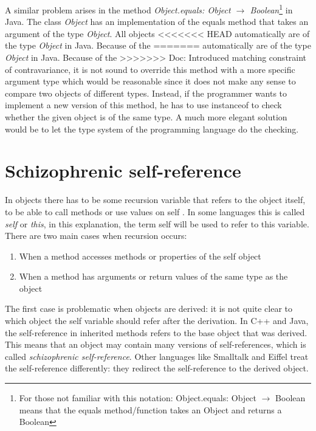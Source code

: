 A similar problem arises in the method \emph{Object.equals: Object
$\rightarrow$ Boolean}\footnote{For those not familiar with this
notation: Object.equals: Object $\rightarrow$ Boolean means that
the equals method/function takes an Object and returns a Boolean}
in Java. The class \emph{Object} has an implementation of the equals
method that takes an argument of the type \emph{Object}. All objects
<<<<<<< HEAD
automatically are of the type \emph{Object} in Java.	Because of the
=======
automatically are of the type \emph{Object} in Java.  Because of the
>>>>>>> Doc: Introduced matching
constraint of contravariance, it is not sound to override this method
with a more specific argument type which would be reasonable since it does
not make any sense to compare two objects of different types. Instead,
if the programmer wants to implement a new version of this method, he
has to use instanceof to check whether the given object is of the same
type. A much more elegant solution would be to let the type system of
the programming language do the checking.\\

\section{Schizophrenic self-reference}
\label{sec:schizoReferences}

In objects there has to be some recursion variable that refers to the
object itself, to be able to call methods or use values on self . 
In some languages this is called \emph{self} or \emph{this}, in
this explanation, the term self will be used to refer to this variable. \\

There are two main cases when recursion occurs:
\begin{enumerate}
\item When a method accesses methods or properties of the self object
\item When a method has arguments or return values of the same type as the object
\end{enumerate}

The first case is problematic when objects are derived: it is not quite
clear to which object the self variable should refer after the derivation.
In C++ and Java, the self-reference in inherited methods refers to the
base object that was derived. This means that an object may contain
many versions of self-references, which is called \emph{schizophrenic
self-reference}. Other languages like Smalltalk and Eiffel treat the
self-reference differently: they redirect the self-reference to the
derived object. \\

